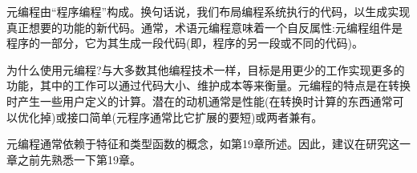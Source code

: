 元编程由“程序编程”构成。换句话说，我们布局编程系统执行的代码，以生成实现真正想要的功能的新代码。通常，术语元编程意味着一个自反属性:元编程组件是程序的一部分，它为其生成一段代码(即，程序的另一段或不同的代码)。

为什么使用元编程?与大多数其他编程技术一样，目标是用更少的工作实现更多的功能，其中的工作可以通过代码大小、维护成本等来衡量。元编程的特点是在转换时产生一些用户定义的计算。潜在的动机通常是性能(在转换时计算的东西通常可以优化掉)或接口简单(元程序通常比它扩展的要短)或两者兼有。

元编程通常依赖于特征和类型函数的概念，如第19章所述。因此，建议在研究这一章之前先熟悉一下第19章。